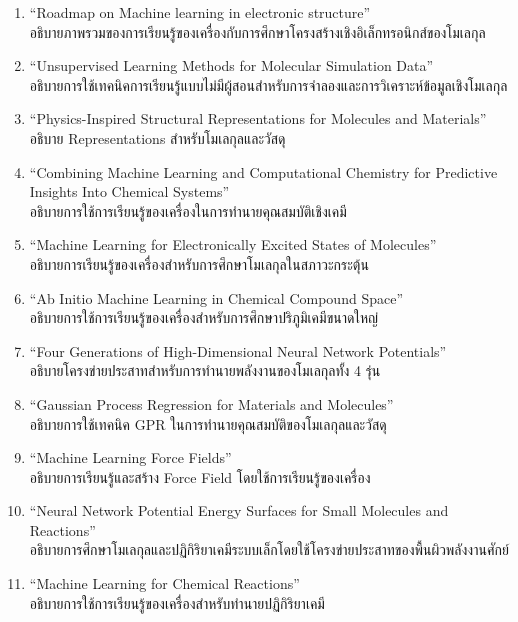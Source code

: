 \begin{enumerate}
    \item \enquote{Roadmap on Machine learning in electronic structure}\autocite{kulik2022}\\
    อธิบายภาพรวมของการเรียนรู้ของเครื่องกับการศึกษาโครงสร้างเชิงอิเล็กทรอนิกส์ของโมเลกุล
    
    \item \enquote{Unsupervised Learning Methods for Molecular Simulation Data}\autocite{glielmo2021}\\
    อธิบายการใช้เทคนิคการเรียนรู้แบบไม่มีผู้สอนสำหรับการจำลองและการวิเคราะห์ข้อมูลเชิงโมเลกุล

    \item \enquote{Physics-Inspired Structural Representations for Molecules and Materials}\autocite{musil2021}\\
    อธิบาย Representations สำหรับโมเลกุลและวัสดุ

    \item \enquote{Combining Machine Learning and Computational Chemistry for Predictive Insights Into Chemical 
    Systems}\autocite{keith2021}\\
    อธิบายการใช้การเรียนรู้ของเครื่องในการทำนายคุณสมบัติเชิงเคมี

    \item \enquote{Machine Learning for Electronically Excited States of Molecules}\autocite{westermayr2021a}\\
    อธิบายการเรียนรู้ของเครื่องสำหรับการศึกษาโมเลกุลในสภาวะกระตุ้น

    \item \enquote{Ab Initio Machine Learning in Chemical Compound Space}\autocite{huang2021}\\
    อธิบายการใช้การเรียนรู้ของเครื่องสำหรับการศึกษาปริภูมิเคมีขนาดใหญ่

    \item \enquote{Four Generations of High-Dimensional Neural Network Potentials}\autocite{behler2021}\\
    อธิบายโครงข่ายประสาทสำหรับการทำนายพลังงานของโมเลกุลทั้ง 4 รุ่น

    \item \enquote{Gaussian Process Regression for Materials and Molecules}\autocite{deringer2021}\\
    อธิบายการใช้เทคนิค GPR ในการทำนายคุณสมบัติของโมเลกุลและวัสดุ

    \item \enquote{Machine Learning Force Fields}\autocite{unke2021}\\
    อธิบายการเรียนรู้และสร้าง Force Field โดยใช้การเรียนรู้ของเครื่อง

    \item \enquote{Neural Network Potential Energy Surfaces for Small Molecules and Reactions}\autocite{manzhos2021}\\
    อธิบายการศึกษาโมเลกุลและปฏิกิริยาเคมีระบบเล็กโดยใช้โครงข่ายประสาทของพื้นผิวพลังงานศักย์

    \item \enquote{Machine Learning for Chemical Reactions}\autocite{meuwly2021}\\
    อธิบายการใช้การเรียนรู้ของเครื่องสำหรับทำนายปฏิกิริยาเคมี

\end{enumerate}
